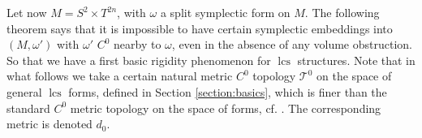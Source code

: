 \documentclass{amsart}
\numberwithin{equation}{section}
\newtheorem{theorem}[equation]{Theorem}
\theoremstyle{definition}
\theoremstyle{remark}
\DeclareMathOperator{\lcs}{lcs}
\DeclareMathOperator{\lcsm}{lcsm}
\begin{document}

Let now $M=S ^{2} \times T ^{2n}$, with $\omega$ a split symplectic form on $M$. 
The following theorem says that it is impossible to have certain symplectic embeddings into $(M, \omega')$ with $\omega'$ $C ^{0} $ nearby to $\omega$, even in the absence of any volume obstruction. So that we have a first basic rigidity phenomenon for $\lcs$ structures.
Note that in what follows we take a certain natural metric $C ^{0} $ topology $\mathcal{T} ^{0} $ on the space of general $\lcs$ forms, defined in Section \ref{section:basics}, which is finer than the standard $C ^{0} $ metric topology on the space of forms, cf. \cite [Section 6]{citeBanyagaConformal}.
The corresponding metric is denoted $d _{0} $.
\end{document}
